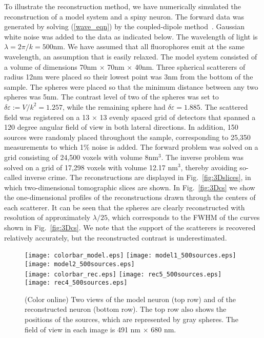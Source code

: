 \documentclass[prl,twocolumn]{revtex4-1}
\begin{document}
To illustrate the reconstruction method, we have numerically simulated the reconstruction of a model system and a spiny neuron. The forward data was generated by solving (\ref{wave_eqn}) by the coupled-dipole method~\cite{43110825,TMatrix2}.  Gaussian white noise was added to the data as indicated below. The wavelength of light is $\lambda=2\pi/k = 500$nm. We have assumed that all fluorophores emit at the same wavelength, an assumption that is easily relaxed. The model system consisted of a volume of dimensions 70nm $\times$ 70nm $\times$ 40nm.  Three spherical scatterers of radius 12nm were placed so their lowest point was 3nm from the bottom of the sample. The spheres were placed so that the minimum distance between any two spheres was 5nm. The contrast level of two of the spheres was set to $\delta\varepsilon:=V/k^2=1.257$, while the remaining sphere had $\delta\varepsilon=1.885$.  The scattered field was registered on a 13 $\times$ 13 evenly spaced grid of detectors that spanned a 120 degree angular field of view in both lateral directions. In addition, 150 sources were randomly placed throughout the sample, corresponding to 25,350 measurements to which 1\% noise is added. The forward problem was solved on a grid consisting of 24,500 voxels with volume 8nm$^3$. The inverse problem was solved on a grid of 17,298 voxels with volume 12.17 nm$^3$, thereby avoiding so-called inverse crime. The reconstructions are displayed in Fig.~\ref{fig:3Dslices}, in which two-dimensional tomographic slices are shown. In Fig.~\ref{fig:3Dcs} we show the one-dimensional profiles of the reconstructions drawn through the centers of each scatterer. It can be seen that the spheres are clearly reconstructed with resolution of approximately $\lambda/25$, which corresponds to the FWHM of the curves shown in Fig.~\ref{fig:3Dcs}. We note that the support of the scatterers is recovered relatively accurately, but the reconstructed contrast is underestimated.


\begin{figure}[t]
\centering
\texttt{[image: colorbar\_model.eps]}\hspace{2mm}
\texttt{[image: model1\_500sources.eps]}
\texttt{[image: model2\_500sources.eps]}\vspace{4mm}\\
\texttt{[image: colorbar\_rec.eps]}\hspace{2mm}
\texttt{[image: rec5\_500sources.eps]}
\texttt{[image: rec4\_500sources.eps]}
\caption{(Color online) Two views of the model neuron (top row) and of the reconstructed neuron (bottom row). The top row also shows the positions of the sources, which are represented by gray spheres. The field of view in each image is 491 nm $\times$ 680 nm.
}
\label{fig:neurons}
\end{figure}
\end{document}
